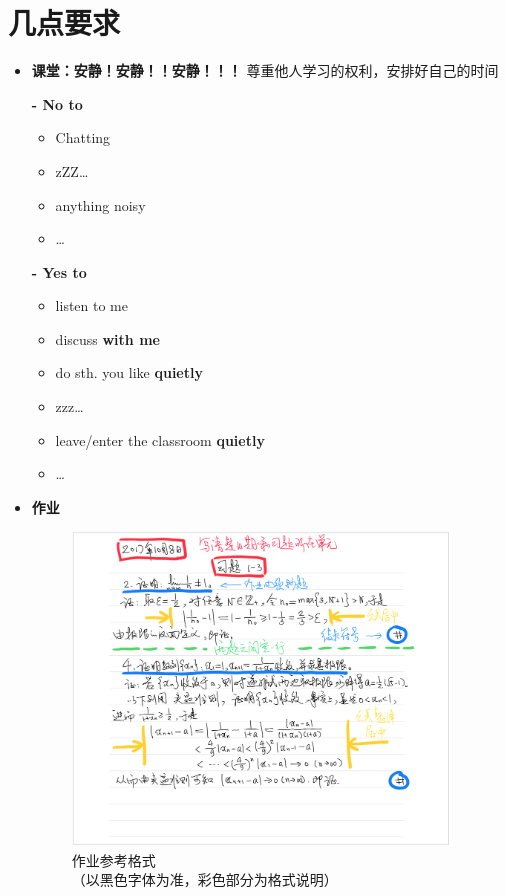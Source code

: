 \section{几点要求}
\begin{itemize}
	\item {\bf 课堂：安静！安静！！安静！！！}
	尊重他人学习的权利，安排好自己的时间
	
	{\bf - No to}
	  \begin{itemize}
	    \item Chatting
	    \item zZZ\ldots
	    \item anything noisy
	    \item \ldots
	  \end{itemize}
	{\bf - Yes to}
  \begin{itemize}
    \item listen to me
    \item discuss {\bf with me}
    \item do sth. you like {\bf quietly}
    \item zzz\ldots
    \item leave/enter the classroom {\bf quietly}
    \item \ldots
  \end{itemize}
  \item {\bf 作业}
  \begin{figure}[h]
  	\begin{center}
  		\includegraphics[width=0.95\textwidth]{./images/Ch00/hw-sample.jpg}
  		\caption{作业参考格式\\ （以黑色字体为准，彩色部分为格式说明）}

\end{center}
\end{figure}
\end{itemize}
